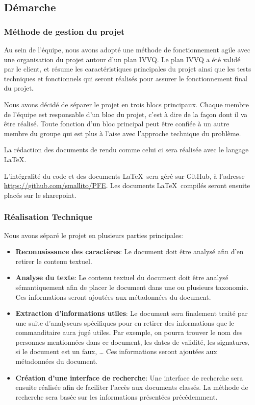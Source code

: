 \subsection{Démarche}
\subsubsection{Méthode de gestion du projet}

Au sein de l'équipe, nous avons adopté une méthode de fonctionnement agile avec une organisation du projet autour d'un plan IVVQ\@.
Le plan IVVQ a été validé par le client, et résume les caractéristiques principales du projet ainsi que les tests techniques et fonctionnels qui seront réalisés pour assurer le fonctionnement final du projet.


Nous avons décidé de séparer le projet en trois blocs principaux.
Chaque membre de l'équipe est responsable d'un bloc du projet, c'est à dire de la façon dont il va être réalisé.
Toute fonction d'un bloc principal peut être confiée à un autre membre du groupe qui est plus à l'aise avec l'approche technique du problème.


La rédaction des documents de rendu comme celui ci sera réalisée avec le langage \LaTeX.


L'intégralité du code et des documents \LaTeX~sera géré sur GitHub, à l'adresse \url{https://github.com/smallito/PFE}.
Les documents \LaTeX~compilés seront ensuite placés sur le sharepoint.



\subsubsection{Réalisation Technique}

Nous avons séparé le projet en plusieurs parties principales:
\begin{itemize}
\item \textbf{Reconnaissance des caractères}:
Le document doit être analysé afin d'en retirer le contenu textuel.

\item \textbf{Analyse du texte}:
Le contenu textuel du document doit être analysé sémantiquement afin de placer le document dans une ou plusieurs taxonomie. 
Ces informations seront ajoutées aux métadonnées du document.

\item \textbf{Extraction d'informations utiles}:
Le document sera finalement traité par une suite d'analyseurs spécifiques pour en retirer des informations que le commanditaire aura jugé utiles.
Par exemple, on pourra trouver le nom des personnes mentionnées dans ce document, les dates de validité, les signatures, si le document est un faux, \ldots 
Ces informations seront ajoutées aux métadonnées du document.

\item \textbf{Création d'une interface de recherche}:
Une interface de recherche sera ensuite réalisée afin de faciliter l'accès aux documents classés.
La méthode de recherche sera basée sur les informations présentées précédemment.

\end{itemize}




